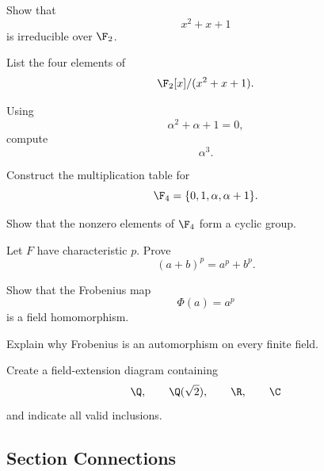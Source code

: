 \begin{exercise}[2]
Show that
\[ x^2+x+1 \]
is irreducible over \(\F_2\).
\end{exercise}

\begin{exercise}[2]
List the four elements of
\[ \F_2[x]/(x^2+x+1). \]
\end{exercise}

\begin{exercise}[2]
Using
\[ \alpha^2+\alpha+1=0, \]
compute
\[ \alpha^3. \]
\end{exercise}

\begin{exercise}[3]
Construct the multiplication table for
\[ \F_4=\{0,1,\alpha,\alpha+1\}. \]
\end{exercise}

\begin{exercise}[3]
Show that the nonzero elements of \(\F_4\) form a cyclic group.
\end{exercise}

\begin{exercise}[3]
Let \(F\) have characteristic \(p\). Prove
\[ (a+b)^p=a^p+b^p. \]
\end{exercise}

\begin{exercise}[3]
Show that the Frobenius map
\[ \Phi(a)=a^p \]
is a field homomorphism.
\end{exercise}

\begin{exercise}[3]
Explain why Frobenius is an automorphism on every finite field.
\end{exercise}

\begin{exercise}[3]
Create a field-extension diagram containing
\[ \Q,\qquad\Q(\sqrt2),\qquad\R,\qquad\C \]
and indicate all valid inclusions.
\end{exercise}

\subsection{Section Connections}
\label{subsec:field-theory-connections}


